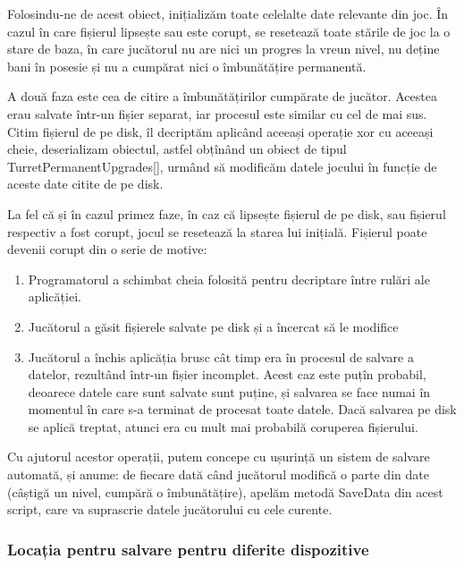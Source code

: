 \documentclass[12pt, a4paper]{article}
\begin{document}
	Folosindu-ne de acest obiect, inițializăm toate celelalte date relevante din joc. În cazul în care fișierul lipsește sau este corupt, se resetează toate stările de joc la o stare de baza, în care jucătorul nu are nici un progres la vreun nivel, nu deține bani în posesie și nu a cumpărat nici o îmbunătățire permanentă.
	\newline
	
	A două faza este cea de citire a îmbunătățirilor cumpărate de jucător. Acestea erau salvate într-un fișier separat, iar procesul este similar cu cel de mai sus. Citim fișierul de pe disk, îl decriptăm aplicând aceeași operație xor cu aceeași cheie, deserializam obiectul, astfel obțînând un obiect de tipul TurretPermanentUpgrades[], urmând să modificăm datele jocului în funcție de aceste date citite de pe disk.
	\newline
	
	La fel că și în cazul primez faze, în caz că lipsește fișierul de pe disk, sau fișierul respectiv a fost corupt, jocul se resetează la starea lui inițială. Fișierul poate devenii corupt din o serie de motive:
	
	\begin{enumerate}
		\item Programatorul a schimbat cheia folosită pentru decriptare între rulări ale aplicăției.
		\item Jucătorul a găsit fișierele salvate pe disk și a încercat să le modifice
		\item Jucătorul a închis aplicăția brusc cât timp era în procesul de salvare a datelor, rezultând într-un fișier incomplet. Acest caz este puțîn probabil, deoarece datele care sunt salvate sunt puține, și salvarea se face numai în momentul în care s-a terminat de procesat toate datele. Dacă salvarea pe disk se aplică treptat, atunci era cu mult mai probabilă coruperea fișierului.
	\end{enumerate}
	
	Cu ajutorul acestor operații, putem concepe cu ușurință un sistem de salvare automată, și anume: de fiecare dată când jucătorul modifică o parte din date (câștigă un nivel, cumpără o îmbunătățire), apelăm metodă SaveData din acest script, care va suprascrie datele jucătorului cu cele curente.
	
	
	
	
	\subsubsection{Locația pentru salvare pentru diferite dispozitive}
	\label{section: androidSave}
	
\end{document}
